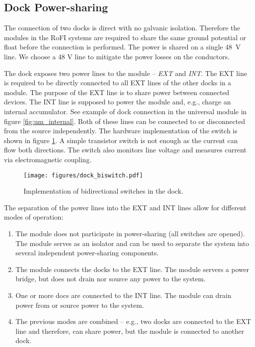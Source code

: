 \subsection{Dock Power-sharing}

The connection of two docks is direct with no galvanic isolation. Therefore the
modules in the RoFI systems are required to share the same ground potential or
float before the connection is performed. The power is shared on a single 48~V
line. We choose a 48 V line to mitigate the power losses on the conductors.

The dock exposes two power lines to the module -- \emph{EXT} and \emph{INT}. The
EXT line is required to be directly connected to all EXT lines of the other
docks in a module. The purpose of the EXT line is to share power between
connected devices. The INT line is supposed to power the module and, e.g.,
charge an internal accumulator. See example of dock connection in the universal
module in figure \ref{fig:um_internal}. Both of these lines can be connected
to or disconnected from the source independently. The hardware implementation of
the switch is shown in figure \ref{fig:dock_biswitch}. A simple transistor
switch is not enough as the current can flow both directions. The switch also
monitors line voltage and measures current via electromagnetic coupling.

\begin{figure}[t]
    \centering
    \texttt{[image: figures/dock\_biswitch.pdf]}
    \caption{Implementation of bidirectional switches in the dock.}
    \label{fig:dock_biswitch}
\end{figure}

The separation of the power lines into the EXT and INT lines allow for
different modes of operation:
\begin{enumerate}
    \item The module does not participate in power-sharing (all switches are
    opened). The module serves as an isolator and can be used to separate
    the system into several independent power-sharing components.
    \item The module connects the docks to the EXT line. The module servers a
    power bridge, but does not drain nor source any power to the system.
    \item One or more docs are connected to the INT line. The module can drain
    power from or source power to the system.
    \item The previous modes are combined -- e.g., two docks are connected to the
    EXT line and therefore, can share power, but the module is connected to
    another dock.
\end{enumerate}

